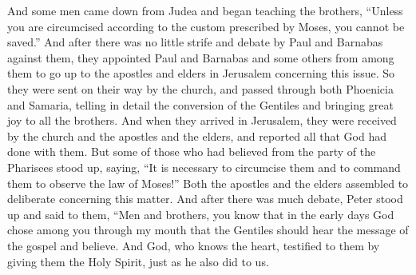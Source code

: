 \begin{biblechapter} %
 And some men came down from Judea and began teaching the brothers, “Unless you are circumcised according to the custom prescribed by Moses, you cannot be saved.”
\verse And after there was no little strife and debate by Paul and Barnabas against them, they appointed Paul and Barnabas and some others from among them to go up to the apostles and elders in Jerusalem concerning this issue.
\verse So they were sent on their way by the church, and passed through both Phoenicia and Samaria, telling in detail the conversion of the Gentiles and bringing great joy to all the brothers.
\verse And when they arrived in Jerusalem, they were received by the church and the apostles and the elders, and reported all that God had done with them.
\verse But some of those who had believed from the party of the Pharisees stood up, saying, “It is necessary to circumcise them and to command them to observe the law of Moses!”
\verse Both the apostles and the elders assembled to deliberate concerning this matter.
\verse And after there was much debate, Peter stood up and said to them, “Men and brothers, you know that in the early days God chose among you through my mouth that the Gentiles should hear the message of the gospel and believe.
\verse And God, who knows the heart, testified to them by giving them the Holy Spirit, just as he also did to us.

\end{biblechapter}
